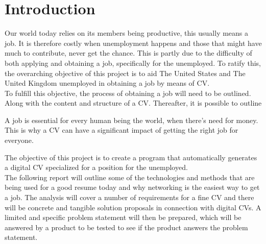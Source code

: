 \section{Introduction}\label{sec:introduction}
Our world today relies on its members being productive, this usually means a job. 
It is therefore costly when unemployment happens and those that might have much to contribute, never get the chance. 
This is partly due to the difficulty of both applying and obtaining a job, specifically for the unemployed. 
To ratify this, the overarching objective of this project is to aid The United States and The United Kingdom unemployed in obtaining a job by means of CV. \\

To fulfill this objective, the process of obtaining a job will need to be outlined. 
Along with the content and structure of a CV. 
Thereafter, it is possible to outline 

A job is essential for every human being the world, when there's need for money. 
This is why a CV can have a significant impact of getting the right job for everyone.
 
The objective of this project is to create a program that automatically generates a digital CV 
specialized for a position for the unemployed. \\

The following report will outline some of the technologies and methods 
that are being used for a good resume today and why networking is the easiest way to get a job. 
The analysis will cover a number of requirements for a fine CV 
and there will be concrete and tangible solution proposals in connection with digital CVs. 
A limited and specific problem statement will then be prepared, 
which will be answered by a product to be tested to see if the product answers the problem statement.

\newpage

